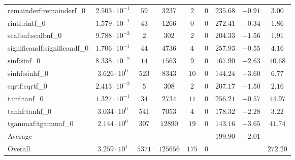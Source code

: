 \begin{tabular}{|l|c|c|c|c|c|c|c|c|}
remainderf:remainderf\_0     & $ 2.503 \cdot 10^{-1} $ & $ 59     $ & $ 3237   $ & $ 2   $ & $ 0   $ & $ 235.68      $ & $ -0.91   $ & $ 3.00    $ \\
rintf:rintf\_0               & $ 1.579 \cdot 10^{-1} $ & $ 43     $ & $ 1266   $ & $ 0   $ & $ 0   $ & $ 272.41      $ & $ -0.34   $ & $ 1.86    $ \\
scalbnf:scalbnf\_0           & $ 9.788 \cdot 10^{-3} $ & $ 2      $ & $ 302    $ & $ 2   $ & $ 0   $ & $ 204.33      $ & $ -1.56   $ & $ 1.91    $ \\
significandf:significandf\_0 & $ 1.706 \cdot 10^{-1} $ & $ 44     $ & $ 4736   $ & $ 4   $ & $ 0   $ & $ 257.93      $ & $ -0.55   $ & $ 4.16    $ \\
sinf:sinf\_0                 & $ 8.338 \cdot 10^{-2} $ & $ 14     $ & $ 1563   $ & $ 9   $ & $ 0   $ & $ 167.90      $ & $ -2.63   $ & $ 10.68   $ \\
sinhf:sinhf\_0               & $ 3.626 \cdot 10^{0}  $ & $ 523    $ & $ 8343   $ & $ 10  $ & $ 0   $ & $ 144.24      $ & $ -3.60   $ & $ 6.77    $ \\
sqrtf:sqrtf\_0               & $ 2.413 \cdot 10^{-2} $ & $ 5      $ & $ 308    $ & $ 2   $ & $ 0   $ & $ 207.17      $ & $ -1.50   $ & $ 2.16    $ \\
tanf:tanf\_0                 & $ 1.327 \cdot 10^{-1} $ & $ 34     $ & $ 2734   $ & $ 11  $ & $ 0   $ & $ 256.21      $ & $ -0.57   $ & $ 14.97   $ \\
tanhf:tanhf\_0               & $ 3.034 \cdot 10^{0}  $ & $ 541    $ & $ 7053   $ & $ 4   $ & $ 0   $ & $ 178.32      $ & $ -2.28   $ & $ 3.22    $ \\
tgammaf:tgammaf\_0           & $ 2.144 \cdot 10^{0}  $ & $ 307    $ & $ 12890  $ & $ 19  $ & $ 0   $ & $ 143.16      $ & $ -3.65   $ & $ 41.74   $ \\
\hline
Average                      & $                     $ & $        $ & $        $ & $     $ & $     $ & $ 199.90      $ & $ -2.01   $ & $         $ \\
\hline
Overall                      & $ 3.259 \cdot 10^{1}  $ & $ 5371   $ & $ 125656 $ & $ 175 $ & $ 0   $ & $             $ & $         $ & $ 272.20  $ \\
\hline
\end{tabular}
